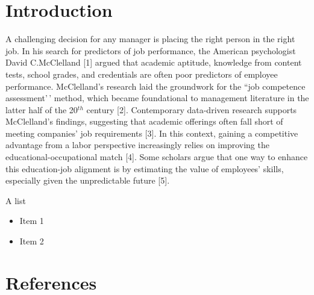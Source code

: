 \documentclass[10pt,letterpaper]{article}
\providecommand{\tightlist}{%
  \setlength{\itemsep}{0pt}\setlength{\parskip}{0pt}}
\begin{document}

\linenumbers

\section{Introduction}\label{introduction}

A challenging decision for any manager is placing the right person in
the right job. In his search for predictors of job performance, the
American psychologist David C.McClelland {[}1{]} argued that academic
aptitude, knowledge from content tests, school grades, and credentials
are often poor predictors of employee performance. McClelland's research
laid the groundwork for the ``job competence assessment'\,' method,
which became foundational to management literature in the latter half of
the 20\(^{th}\) century {[}2{]}. Contemporary data-driven research
supports McClelland's findings, suggesting that academic offerings often
fall short of meeting companies' job requirements {[}3{]}. In this
context, gaining a competitive advantage from a labor perspective
increasingly relies on improving the educational-occupational match
{[}4{]}. Some scholars argue that one way to enhance this education-job
alignment is by estimating the value of employees' skills, especially
given the unpredictable future {[}5{]}.

A list

\begin{itemize}
\tightlist
\item
  Item 1
\item
  Item 2
\end{itemize}

\section*{References}\label{references}
\end{document}
